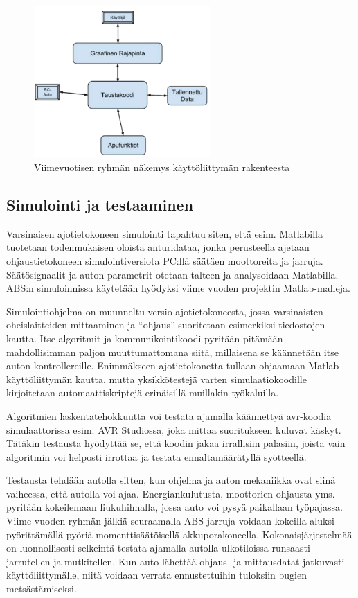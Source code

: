 \documentclass{article}
\begin{document}
\begin{figure}[H]
\centering
\includegraphics[width=0.6\textwidth]{images/origsofta}
\caption{Viimevuotisen ryhmän näkemys käyttöliittymän rakenteesta}
\label{fig:origsofta}
\end{figure}

\subsection{Simulointi ja testaaminen}

Varsinaisen ajotietokoneen simulointi tapahtuu siten, että esim. Matlabilla tuotetaan todenmukaisen oloista anturidataa, jonka perusteella ajetaan ohjaustietokoneen simulointiversiota PC:llä säätäen moottoreita ja jarruja. Säätösignaalit ja auton parametrit otetaan talteen ja analysoidaan Matlabilla. ABS:n simuloinnissa käytetään hyödyksi viime vuoden projektin Matlab-malleja.

Simulointiohjelma on muunneltu versio ajotietokoneesta, jossa varsinaisten oheislaitteiden mittaaminen ja “ohjaus” suoritetaan esimerkiksi tiedostojen kautta. Itse algoritmit ja kommunikointikoodi pyritään pitämään mahdollisimman paljon muuttumattomana siitä, millaisena se käännetään itse auton kontrollereille. Enimmäkseen ajotietokonetta tullaan ohjaamaan Matlab-käyttöliittymän kautta, mutta yksikkötestejä varten simulaatiokoodille kirjoitetaan automaattiskriptejä erinäisillä muillakin työkaluilla.

Algoritmien laskentatehokkuutta voi testata ajamalla käännettyä avr-koodia simulaattorissa esim. AVR Studiossa, joka mittaa suoritukseen kuluvat käskyt. Tätäkin testausta hyödyttää se, että koodin jakaa irrallisiin palasiin, joista vain algoritmin voi helposti irrottaa ja testata ennaltamäärätyllä syötteellä.

Testausta tehdään autolla sitten, kun ohjelma ja auton mekaniikka ovat siinä vaiheessa, että autolla voi ajaa. Energiankulutusta, moottorien ohjausta yms. pyritään kokeilemaan liukuhihnalla, jossa auto voi pysyä paikallaan työpajassa. Viime vuoden ryhmän jälkiä seuraamalla ABS-jarruja voidaan kokeilla aluksi pyörittämällä pyöriä momenttisäätöisellä akkuporakoneella. Kokonaisjärjestelmää on luonnollisesti selkeintä testata ajamalla autolla ulkotiloissa runsaasti jarrutellen ja mutkitellen. Kun auto lähettää ohjaus- ja mittausdatat jatkuvasti käyttöliittymälle, niitä voidaan verrata ennustettuihin tuloksiin bugien metsästämiseksi.
\end{document}
